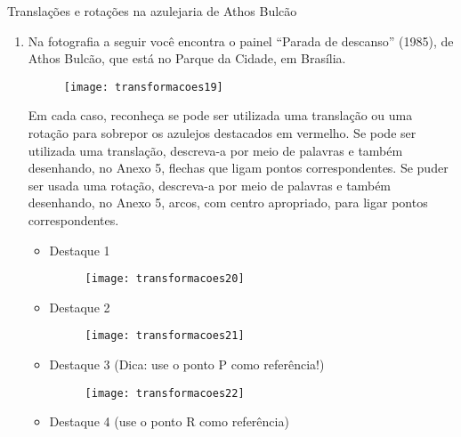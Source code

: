 \begin{task}{Translações e rotações na azulejaria de Athos Bulcão}
\begin{enumerate}
\item Na fotografia a seguir você encontra o painel “Parada de descanso” (1985), de Athos Bulcão, que está no Parque da Cidade, em Brasília.  

\begin{figure}[H]
\centering

\texttt{[image: transformacoes19]}
\end{figure}

Em cada caso, reconheça se pode ser utilizada uma translação ou uma rotação para sobrepor os azulejos destacados em vermelho. Se pode ser utilizada uma translação, descreva-a por meio de palavras e também desenhando, no Anexo 5, flechas que ligam pontos correspondentes. Se puder ser usada uma rotação, descreva-a por meio de palavras e também desenhando, no Anexo 5, arcos, com centro apropriado, para ligar pontos correspondentes. 

\begin{multicols}{2}
\begin{itemize}
\item Destaque 1
\begin{figure}[H]
\centering

\texttt{[image: transformacoes20]}
\end{figure}

\item Destaque 2
\begin{figure}[H]
\centering

\texttt{[image: transformacoes21]}
\end{figure}
\end{itemize}
\end{multicols}

\begin{multicols}{2}
\begin{itemize}
\item Destaque 3 (Dica: use o ponto P como referência!)
\begin{figure}[H]
\centering

\texttt{[image: transformacoes22]}
\end{figure}

\item Destaque 4 (use o ponto R como referência)
\begin{figure}[H]
\centering


\end{figure}
\end{itemize}
\end{multicols}
\end{enumerate}
\end{task}
